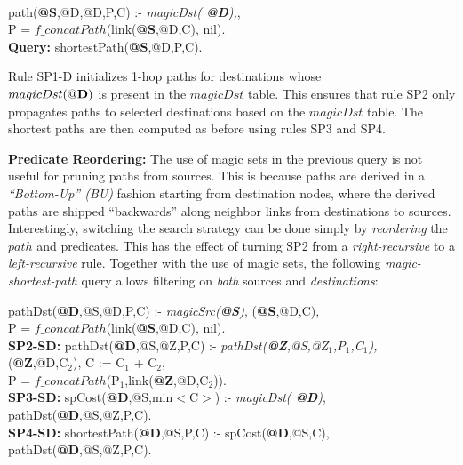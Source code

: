 \vspace{2pt}
{\small
{} \\
 path({\bf @S},@D,@D,P,C) :- {\em magicDst({\bf
@D}),},\\
\datalogspace P = $f\_concatPath$(link({\bf @S},@D,C), nil). \\
{\bf Query: } shortestPath({\bf @S},@D,P,C).
}
\vspace{2pt}


Rule SP1-D initializes 1-hop paths for destinations whose \\$magicDst({\bf @D})$
is present in the $magicDst$ table. This ensures that rule SP2 only
propagates paths to selected destinations based on the $magicDst$
table. The shortest paths are then computed as before using rules SP3
and SP4. 

\noindent
{\bf Predicate Reordering:} The use of magic sets in the previous query is not useful for pruning paths from
  sources. This is because paths are derived in a {\em ``Bottom-Up'' (BU)\/} fashion
  starting from destination nodes, where the derived paths are shipped
  ``backwards'' along neighbor links from destinations to sources. Interestingly, switching the search strategy
  can be done simply by {\em reordering} the $path$ and \link
  predicates. This has the effect of turning SP2 from a {\em right-recursive} to a {\em
  left-recursive} rule. Together with the use of magic sets, the
  following {\em magic-shortest-path} query allows filtering on {\em both} sources and {\em
  destinations}: 

\vspace{2pt}
{\small
{} pathDst({\bf @D},@S,@D,P,C) :- {\em magicSrc({\bf @S})}, \link({\bf @S},@D,C),\\
\datalogspace P = $f\_concatPath$(link({\bf @S},@D,C), nil). \\
{\bf SP2-SD: } pathDst({\bf @D},@S,@Z,P,C) :- {\em pathDst({\bf @Z},@S,@Z$_{1}$,P$_{1}$,C$_{1}$),}\\
\datalogspace\link({\bf @Z},@D,C$_{2}$), C := C$_{1}$ + C$_{2}$, \\
\datalogspace P = $f\_concatPath$(P$_{1}$,link({\bf @Z},@D,C$_{2}$)).\\
{\bf SP3-SD: } spCost({\bf @D},@S,min$<$C$>$) :- {\em magicDst({\bf
    @D})},\\
\datalogspace pathDst({\bf @D},@S,@Z,P,C).\\
{\bf SP4-SD: } shortestPath({\bf @D},@S,P,C) :- spCost({\bf @D},@S,C),\\
\datalogspace pathDst({\bf @D},@S,@Z,P,C).
}
\vspace{2pt}

